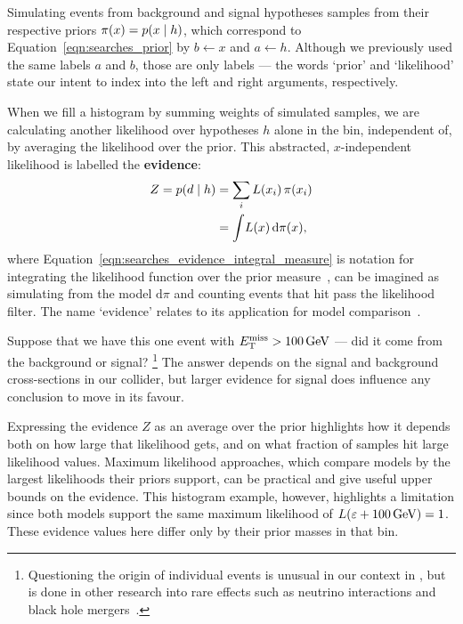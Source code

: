 Simulating events from background and signal hypotheses samples from their
respective priors $\pi(x) = \prob{x}{h}$, which
correspond to Equation~\ref{eqn:searches_prior} by
$b \leftarrow x$ and $a \leftarrow h$.
Although we previously used the same labels $a$ and $b$, those are only
labels --- the words `prior' and `likelihood' state our intent to index into
the left and right arguments, respectively.

When we fill a histogram by summing weights of simulated samples, we are
calculating another likelihood over hypotheses $h$ alone in the bin,
independent of, by averaging the likelihood over the prior.
This abstracted, $x$-independent likelihood is labelled the \textbf{evidence}:
\begin{align}
Z
= \prob{d}{h} &= \sum_i L(x_i) \,\pi(x_i)
\label{eqn:searches_evidence_integral_sum}
\\
&= \int\! L(x) \,\mathrm{d}\pi(x),
\label{eqn:searches_evidence_integral_measure}
\end{align}
where Equation~\ref{eqn:searches_evidence_integral_measure} is notation for
integrating the likelihood function over the prior measure~\cite{
billingsley2008probability,
skilling2010foundations
},
can be imagined as simulating from the model $\mathrm{d}\pi$ and
counting events that hit pass the likelihood filter.
The name `evidence' relates to its application for model
comparison~\cite{mackay2003information}.


Suppose that we have this one event with $\met > 100\,\eV[G]$ ---
did it come from the background or signal?%
\footnote{%
Questioning the origin of individual events is unusual in our context in
\atlas, but is done in other research into rare effects such as neutrino
interactions and black hole mergers~\cite{
opera2010event,
icecube2020event,
Abbott2021event
}.%
}
The answer depends on the signal and background cross-sections in our collider,
but larger evidence for signal does influence any conclusion to move in its
favour.

Expressing the evidence $Z$ as an average over the prior highlights how it
depends both on how large that likelihood gets,
and on what fraction of samples hit large likelihood values.
Maximum likelihood approaches,
which compare models by the largest likelihoods their priors support,
can be practical and give useful upper bounds on the evidence.
This histogram example, however, highlights a limitation since both models
support the same maximum likelihood of
$L(\varepsilon + 100\,\eV[G]) = 1$.
These evidence values here differ only by their prior masses in that bin.

